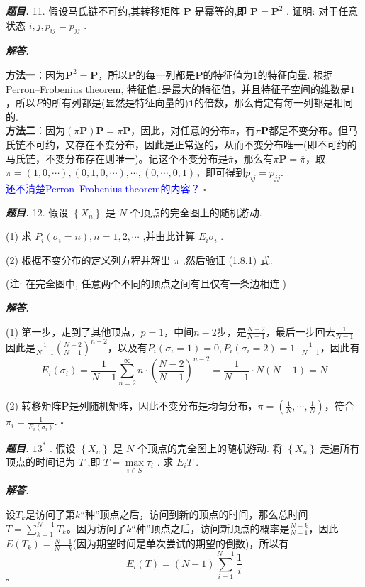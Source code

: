 \documentclass[10pt, a4paper, oneside]{ctexart}
\newenvironment{problem}{\begin{framed}\par\noindent\textbf{\textit{题目. }}}{\end{framed}\par}
\newenvironment{solution}{%
  \par\noindent\textbf{\textit{解答. }}\ignorespaces
}{%
  \hfill\ensuremath{\square}\par %
}
\begin{document}
\begin{problem}
    11. 假设马氏链不可约,其转移矩阵 \( \mathbf{P} \) 是幂等的,即 \( \mathbf{P} = {\mathbf{P}}^{2} \) . 证明: 对于任意状态 \( i,j,{p}_{ij} = {p}_{jj} \) .
\end{problem}
\begin{solution}
    \textbf{方法一}：因为$\mathbf{P}^2=\mathbf{P}$，所以$\mathbf{P}$的每一列都是$\mathbf{P}$的特征值为$1$的特征向量. 根据Perron–Frobenius theorem, 特征值$1$是最大的特征值，并且特征子空间的维数是$1$，所以$P$的所有列都是(显然是特征向量的)$\mathbf{1}$的倍数，那么肯定有每一列都是相同的.\\
    \textbf{方法二}：因为$(\pi\mathbf{P})\mathbf{P}=\pi\mathbf{P}$，因此，对任意的分布$\pi$，有$\pi\mathbf{P}$都是不变分布。但马氏链不可约，又存在不变分布，因此是正常返的，从而不变分布唯一(即不可约的马氏链，不变分布存在则唯一)。记这个不变分布是$\overline{\pi}$，那么有$\pi\mathbf{P}=\overline{\pi}$，取$\pi=(1,0,\cdots),(0,1,0,\cdots),\cdots,(0,\cdots,0,1)$，即可得到$p_{ij}=p_{jj}$.\\
    \textcolor{blue}{还不清楚Perron–Frobenius theorem的内容？}
\end{solution}

\begin{problem}
    12. 假设 \( \left\{  {X}_{n}\right\}   \) 是 \( N \) 个顶点的完全图上的随机游动.

(1) 求 \( {P}_{i}\left( {{\sigma }_{i} = n}\right) ,n = 1,2,\cdots  \) ,并由此计算 \( {E}_{i}{\sigma }_{i} \) .

(2) 根据不变分布的定义列方程并解出 \( \pi  \) ,然后验证 (1.8.1) 式.

(注: 在完全图中, 任意两个不同的顶点之间有且仅有一条边相连.)
\end{problem}
\begin{solution}
    (1) 第一步，走到了其他顶点，$p=1$，中间$n-2$步，是$\frac{N-2}{N-1}$，最后一步回去$\frac{1}{N-1}$\\因此是$\frac{1}{N-1}(\frac{N-2}{N-1})^{n-2}$，以及有$P_i(\sigma_i=1)=0,P_i(\sigma_i=2)=1\cdot \frac{1}{N-1}$，因此有
    $$E_i(\sigma_i)=\frac{1}{N-1}\sum_{n=2}^{\infty} n\cdot(\frac{N-2}{N-1})^{n-2}=\frac{1}{N-1}\cdot N(N-1)=N$$\\
    (2) 转移矩阵$\mathbf{P}$是列随机矩阵，因此不变分布是均匀分布，$\pi=(\frac{1}{N},\cdots,\frac{1}{N})$，符合$\pi_i=\frac{1}{E_i(\sigma_i)}$.
\end{solution}

\begin{problem}
    \( {13}^{ * } \) . 假设 \( \left\{  {X}_{n}\right\}   \) 是 \( N \) 个顶点的完全图上的随机游动. 将 \( \left\{  {X}_{n}\right\}   \) 走遍所有顶点的时间记为 \( T \) ,即 \( T = \mathop{\max }\limits_{{i \in  S}}{\tau }_{i} \) . 求 \( {E}_{i}T \) .
\end{problem}
\begin{solution}
    设$T_k$是访问了第$k$“种”顶点之后，访问到新的顶点的时间，那么总时间$T=\sum_{k=1}^{N-1}T_k$。因为访问了$k$“种”顶点之后，访问新顶点的概率是$\frac{N-k}{N-1}$，因此$E(T_k)=\frac{N-1}{N-k}$(因为期望时间是单次尝试的期望的倒数)，所以有
    $$E_i(T)=(N-1)\sum_{i=1}^{N-1}\frac{1}{i}$$
\end{solution}
\end{document}
